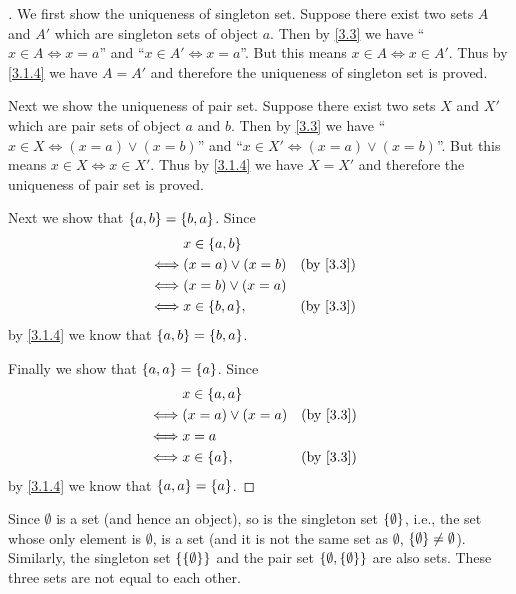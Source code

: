 \begin{proof}[]
  We first show the uniqueness of singleton set.
  Suppose there exist two sets \(A\) and \(A'\) which are singleton sets of object \(a\).
  Then by \cref{3.3} we have ``\(x \in A \iff x = a\)'' and ``\(x \in A' \iff x = a\)''.
  But this means \(x \in A \iff x \in A'\).
  Thus by \cref{3.1.4} we have \(A = A'\) and therefore the uniqueness of singleton set is proved.

  Next we show the uniqueness of pair set.
  Suppose there exist two sets \(X\) and \(X'\) which are pair sets of object \(a\) and \(b\).
  Then by \cref{3.3} we have ``\(x \in X \iff (x = a) \lor (x = b)\)'' and ``\(x \in X' \iff (x = a) \lor (x = b)\)''.
  But this means \(x \in X \iff x \in X'\).
  Thus by \cref{3.1.4} we have \(X = X'\) and therefore the uniqueness of pair set is proved.

  Next we show that \(\left\lbrace a, b\right\rbrace = \left\lbrace b, a\right\rbrace\).
  Since
  \begin{align*}
         & x \in \set{a, b}                   \\
    \iff & (x = a) \lor (x = b) &  & \by{3.3} \\
    \iff & (x = b) \lor (x = a)               \\
    \iff & x \in \set{b, a},    &  & \by{3.3}
  \end{align*}
  by \cref{3.1.4} we know that \(\left\lbrace a, b\right\rbrace = \left\lbrace b, a\right\rbrace\).

  Finally we show that \(\left\lbrace a, a\right\rbrace = \left\lbrace a\right\rbrace\).
  Since
  \begin{align*}
         & x \in \set{a, a}                   \\
    \iff & (x = a) \lor (x = a) &  & \by{3.3} \\
    \iff & x = a                              \\
    \iff & x \in \set{a},       &  & \by{3.3}
  \end{align*}
  by \cref{3.1.4} we know that \(\left\lbrace a, a\right\rbrace = \left\lbrace a\right\rbrace\).
\end{proof}

\begin{eg}\label{3.1.10}
  Since \(\emptyset\) is a set (and hence an object), so is the singleton set \(\left\lbrace\emptyset\right\rbrace\), i.e., the set whose only element is \(\emptyset\), is a set (and it is not the same set as \(\emptyset\), \(\left\lbrace\emptyset\right\rbrace \neq \emptyset\)).
  Similarly, the singleton set \(\left\lbrace\left\lbrace\emptyset\right\rbrace\right\rbrace\) and the pair set \(\left\lbrace\emptyset, \left\lbrace\emptyset\right\rbrace\right\rbrace\) are also sets.
  These three sets are not equal to each other.
\end{eg}

